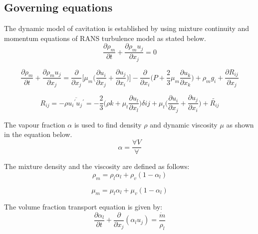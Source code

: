 \subsection{Governing equations}
The dynamic model of cavitation is established by using mixture
continuity and momentum equations of RANS turbulence model as stated
below\cite{Zhao2021}.
\begin{equation}
\frac{\partial{{\rho}_m}}{\partial t} + \frac{\partial{{{\rho}_m}
    u_j}}{\partial{x_j}} = 0
\end{equation}

\begin{equation}
\frac{\partial{{\rho}_m}}{\partial t} + \frac{\partial{{{\rho}_m}
    u_j}}{\partial{x_j}}
=\frac{\partial}{\partial{x_j}}\Bigg[{\mu}_m\Bigg(\frac{\partial{u_i}}{\partial{x_j}}+\frac{\partial{u_j}}{\partial{x_i}}\Bigg)\Bigg]
-\frac{\partial}{\partial{x_i}} \Bigg({P}+{\frac{2}{3}}{\mu}_m
\frac{\partial{u_k}}{\partial{x_k}}\Bigg) + {{\rho}_m}g_i
+\frac{\partial{R_{ij}}}{\partial{x_j}}
\end{equation}

\begin{equation}
R_{ij} = {- \rho \overline{{{u_i}^\prime}{{u_j}^\prime}}} = -
\frac{2}{3}\Bigg({\rho}k
+{{\mu}_t}\frac{\partial{u_l}}{\partial{x_l}}\Bigg)\delta{ij} +
{{\mu}_t}\Bigg({{\frac{\partial{u_i}}{\partial{x_j}}}
  +\frac{\partial{u_j}}{\partial{x_i}}}\Bigg) + {\tilde{R_{ij}}}
\end{equation}

The vapour fraction $\alpha$ is used to find density $\rho$ and
dynamic viscosity $\mu$ as shown in the equation below.
\begin{equation}
\alpha =\frac {\forall{V}}{\forall}
\end{equation}

The mixture density and the viscosity are defined as follows:
\begin{equation}
{{\rho}_m} = {{\rho}_l}{{\alpha}_l} + {{\rho}_v}(1-{{\alpha}_l})
\end{equation}

\begin{equation}
{{\mu}_m} = {{\mu}_l}{{\alpha}_l} +{{\mu}_v}(1-{{\alpha}_l})
\end{equation}

The volume fraction transport equation is given by:
\begin{equation}
\frac{\partial{\alpha}_l}{\partial t}+\frac{\partial}{\partial{x_j}}
({{\alpha}_l}{u_j}) = \frac{\dot{m}}{{\rho}_l}
\end{equation}

